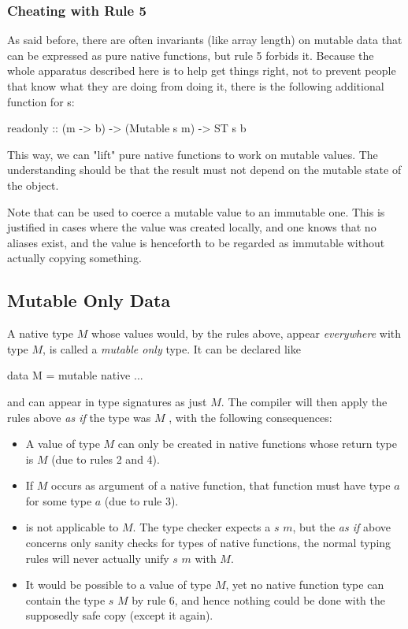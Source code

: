 \subsubsection{Cheating with Rule 5}

As said before, there are often invariants (like array length) on mutable data that can be expressed as pure native functions, but rule 5 forbids it. Because the whole apparatus described here is to help get things right, not to prevent people that know what they are doing from doing it, there is the following additional function for s:

\begin{code}
readonly :: (m -> b) -> (Mutable s m) -> ST s b
\end{code}

This way, we can "lift" pure native functions to work on mutable values. The understanding should be that the result must not depend on the mutable state of the object.

Note that    can be used to coerce a mutable value to an immutable one. This is justified in cases where the value was created locally, and one knows that no aliases exist, and the value is henceforth to be regarded as immutable without actually copying something.

\subsection{Mutable Only Data} \label{mutableonly}

A native type $M$ whose values would, by the rules above, appear \emph{everywhere} with type  $M$, is called a \emph{mutable only} type. It can be declared like

\begin{code}
data M = mutable native ...
\end{code}

and can appear in type signatures as just $M$. The compiler will then apply the rules above \emph{as if} the type was  $M$ , with the following consequences:

\begin{itemize}
\item A value of type $M$ can only be created in native functions whose return type is  $M$ (due to rules 2 and 4).
\item If $M$ occurs as argument of a native function, that function must have type  $a$ for some type $a$ (due to rule 3).
\item {} is not applicable to $M$. The type checker expects a  $s$ $m$, but the \emph{as if} above concerns only sanity checks for types of native functions, the normal typing rules will never actually unify  $s$ $m$ with $M$.
\item It would be possible to  a value of type $M$, yet no native function type can contain the type  $s$ $M$ by rule 6, and hence nothing could be done with the supposedly safe copy (except  it again).
\end{itemize}

